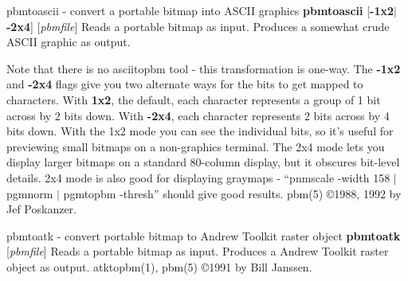 pbmtoascii - convert a portable bitmap into ASCII graphics
{\bf pbmtoascii}
{\rm [}{\bf -1x2}{\rm $|$}{\bf -2x4}{\rm ]}
{\rm [}{\it pbmfile}{\rm ]}
Reads a portable bitmap as input.
Produces a somewhat crude ASCII graphic as output.
\par
Note that there is no asciitopbm tool - this transformation is one-way.
The
{\bf -1x2}
and
{\bf -2x4}
flags give you two alternate ways for the bits to get mapped to characters.
With
{\bf 1x2}{\rm ,}
the default, each character represents a group of 1 bit across by 2 bits down.
With
{\bf -2x4}{\rm ,}
each character represents 2 bits across by 4 bits down.
With the 1x2 mode you can see the individual bits, so it's useful for
previewing small bitmaps on a non-graphics terminal.
The 2x4 mode lets you display larger bitmaps on a standard 80-column display,
but it obscures bit-level details.
2x4 mode is also good for displaying
graymaps - ``pnmscale -width 158 $|$ pgmnorm $|$ pgmtopbm -thresh''
should give good results.
pbm(5)
\copyright 1988, 1992 by Jef Poskanzer.
%
 
%

\newpage
%

pbmtoatk - convert portable bitmap to Andrew Toolkit raster object
{\bf pbmtoatk}
{\rm [}{\it pbmfile}{\rm ]}
Reads a portable bitmap as input.
Produces a Andrew Toolkit raster object as output.
atktopbm(1), pbm(5)
\copyright 1991 by Bill Janssen.
%
 
